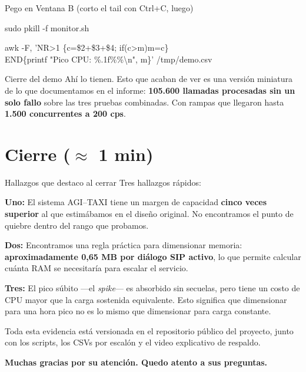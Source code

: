 \documentclass[11pt,letterpaper]{article}
\begin{document}
\begin{accion}{Pego en Ventana B (corto el tail con Ctrl+C, luego)}
\begin{comando}
sudo pkill -f monitor.sh

awk -F, 'NR>1 \{c=\$2+\$3+\$4; if(c>m)m=c\} \\
END\{printf "Pico CPU: \%.1f\%\%\textbackslash n", m\}' /tmp/demo.csv
\end{comando}
\end{accion}

\begin{habla}{Cierre del demo}
Ah\'i lo tienen. Esto que acaban de ver es una versi\'on miniatura de lo que documentamos en el informe: \textbf{105.600 llamadas procesadas sin un solo fallo} sobre las tres pruebas combinadas. Con rampas que llegaron hasta \textbf{1.500 concurrentes a 200 cps}.
\end{habla}

\section*{Cierre ($\approx$ 1 min)}

\begin{cierre}{Hallazgos que destaco al cerrar}
Tres hallazgos r\'apidos:

\textbf{Uno:} El sistema AGI--TAXI tiene un margen de capacidad \textbf{cinco veces superior} al que estim\'abamos en el dise\~no original. No encontramos el punto de quiebre dentro del rango que probamos.

\textbf{Dos:} Encontramos una regla pr\'actica para dimensionar memoria: \textbf{aproximadamente 0,65 MB por di\'alogo SIP activo}, lo que permite calcular cu\'anta RAM se necesitar\'ia para escalar el servicio.

\textbf{Tres:} El pico s\'ubito ---el \textit{spike}--- es absorbido sin secuelas, pero tiene un costo de CPU mayor que la carga sostenida equivalente. Esto significa que dimensionar para una hora pico no es lo mismo que dimensionar para carga constante.

Toda esta evidencia est\'a versionada en el repositorio p\'ublico del proyecto, junto con los scripts, los CSVs por escal\'on y el video explicativo de respaldo.

\textbf{Muchas gracias por su atenci\'on. Quedo atento a sus preguntas.}
\end{cierre}
\end{document}
